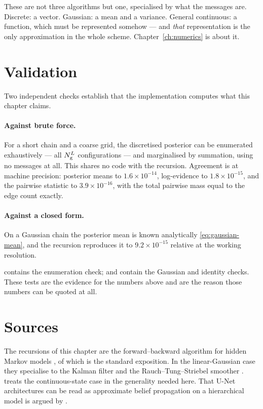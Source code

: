 \begin{intuition}
These are not three algorithms but one, specialised by what the messages are. Discrete: a
vector. Gaussian: a mean and a variance. General continuous: a function, which must be
represented somehow --- and \emph{that} representation is the only approximation in the whole
scheme. Chapter~\ref{ch:numerics} is about it.
\end{intuition}

\section{Validation}
\label{sec:bp-validation}

Two independent checks establish that the implementation computes what this chapter claims.

\paragraph{Against brute force.} For a short chain and a coarse grid, the discretised
posterior can be enumerated exhaustively --- all $N_{\mathrm{g}}^{L}$ configurations --- and
marginalised by summation, using no messages at all. This shares no code with the recursion.
Agreement is at machine precision: posterior means to $1.6\times10^{-14}$, log-evidence to
$1.8\times10^{-15}$, and the pairwise statistic to $3.9\times10^{-16}$, with the total pairwise
mass equal to the edge count exactly.

\paragraph{Against a closed form.} On a Gaussian chain the posterior mean is known
analytically \eqref{eq:gaussian-mean}, and the recursion reproduces it to $9.2\times10^{-15}$
relative at the working resolution.

\begin{codebox}
 contains the enumeration check;
 and 
contain the Gaussian and identity checks. These tests are the evidence for the numbers above
and are the reason those numbers can be quoted at all.
\end{codebox}

\section*{Sources}
The recursions of this chapter are the forward--backward algorithm for hidden Markov models
\citep{baum1970}, of which \citet{rabiner1989tutorial} is the standard exposition. In the
linear-Gaussian case they specialise to the Kalman filter \citep{kalman1960new} and the
Rauch--Tung--Striebel smoother \citep{rauch1965maximum}. \citet{cappe2005} treats the continuous-state
case in the generality needed here. That U-Net architectures can be read as approximate belief
propagation on a hierarchical model is argued by \citet{mei2024unets}.
